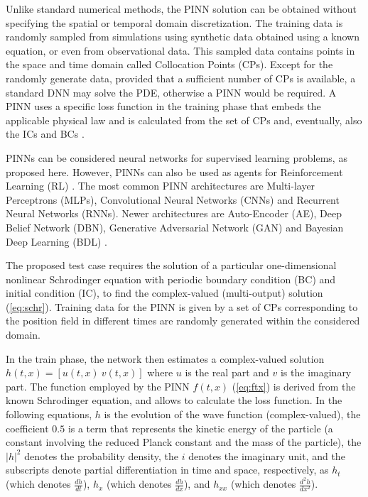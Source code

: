 \documentclass[conference]{IEEEtran}
\begin{document}
Unlike standard numerical methods, the PINN solution can be obtained without specifying the spatial or temporal domain discretization. The training data is randomly sampled from simulations using synthetic data obtained using a known equation, or even from observational data. This sampled data contains points in the space and time domain called Collocation Points (CPs). Except for the randomly generate data, provided that a sufficient number of CPs is available, a standard DNN may solve the PDE, otherwise a PINN would be required. A PINN uses a specific loss function in the training phase that embeds the applicable physical law and is calculated from the set of CPs and, eventually, also the ICs and BCs \cite{Cuomo2022}.

PINNs can be considered neural networks for supervised learning problems, as proposed here. However, PINNs can also be used as agents for Reinforcement Learning (RL) \cite{Cuomo2022}. The most common PINN architectures are Multi-layer Perceptrons (MLPs), Convolutional Neural Networks (CNNs) and Recurrent Neural Networks (RNNs). Newer architectures are Auto-Encoder (AE), Deep Belief Network (DBN), Generative Adversarial Network (GAN) and Bayesian Deep Learning (BDL) \cite{Cuomo2022}. 

The proposed test case requires the solution of a particular one-dimensional nonlinear Schrodinger equation with periodic boundary condition (BC) and initial condition (IC), to find the complex-valued (multi-output) solution (\autoref {eq:schr}). Training data for the PINN is given by a set of CPs corresponding to the position field in different times are randomly generated within the considered domain.
 
In the train phase, the network then estimates a complex-valued solution $h(t,x) = [u(t,x) \ v(t,x)]$ where $u$ is the real part and $v$ is the imaginary part. 
The function employed by the PINN $f(t,x)$ (\autoref {eq:ftx}) is derived from the known Schrodinger equation, and allows to calculate the loss function. 
In the following equations, $h$ is the evolution of the wave function (complex-valued), 
the coefficient $0.5$ is a term that represents the kinetic energy of the particle (a constant involving the reduced Planck constant and the mass of the particle), 
the $|h|^2$ denotes the probability density,
the $i$ denotes the imaginary unit,
and the subscripts denote partial differentiation in time and space, respectively, as
$h_t$ (which denotes $\frac{dh}{dt}$), 
$h_{x}$ (which denotes $\frac{dh}{dx}$), and
$h_{xx}$ (which denotes $\frac{d^2h}{dx^2}$).
\end{document}
